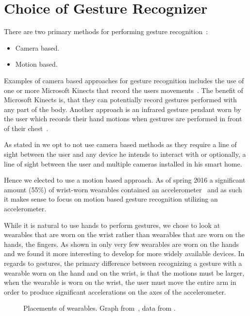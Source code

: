 \section{Choice of Gesture Recognizer}
\label{sec:analysis:choice-of-gesture-recognizer}

There are two primary methods for performing gesture recognition~\cite[pp. 19-21]{prespecialisation}:

\begin{itemize}
\item Camera based.
\item Motion based.
\end{itemize}

Examples of camera based approaches for gesture recognition includes the use of one or more Microsoft Kinects that record the users movements~\cite{caon2011context}. The benefit of Microsoft Kinects is, that they can potentially record gestures performed with any part of the body. Another approach is an infrared gesture pendant worn by the user which records their hand motions when gestures are performed in front of their chest~\cite{starner2000gesture}.

As stated in  we opt to not use camera based methods as they require a line of sight between the user and any device he intends to interact with or optionally, a line of sight between the user and multiple cameras installed in his smart home.

Hence we elected to use a motion based approach. As of spring 2016 a significant amount (55\%) of wrist-worn wearables contained an accelerometer~\cite[pp. 2-3]{prespecialisation} and as such it makes sense to focus on motion based gesture recognition utilizing an accelerometer.

While it is natural to use hands to perform gestures, we chose to look at wearables that are worn on the wrist rather than wearables that are worn on the hands, \eg the fingers. As shown in  only very few wearables are worn on the hands and we found it more interesting to develop for more widely available devices. In regards to gestures, the primary difference between recognizing a gesture with a wearable worn on the hand and on the wrist, is that the motions must be larger, when the wearable is worn on the wrist, \ie the user must move the entire arm in order to produce significant accelerations on the axes of the accelerometer.

\begin{figure}[!htb]
  \centering
  
  \caption{Placements of wearables. Graph from~\cite[p. 2]{prespecialisation}, data from \protect\cite{LISTOFWEARABLES}.}
\label{fig:wearables-placement}
\end{figure}

